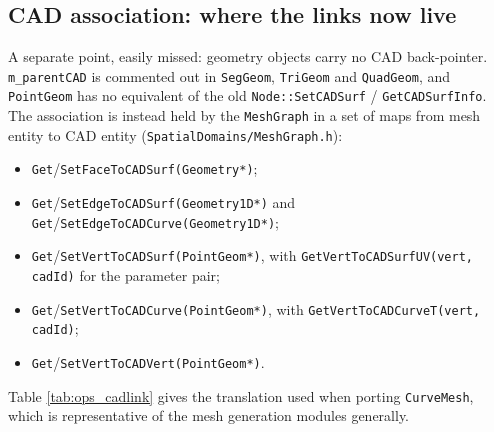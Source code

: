 \subsection{CAD association: where the links now live}
\label{sect:cad_links}
A separate point, easily missed: geometry objects carry no CAD
back-pointer. \texttt{m\_parentCAD} is commented out in
\texttt{SegGeom}, \texttt{TriGeom} and \texttt{QuadGeom}, and
\texttt{PointGeom} has no equivalent of the old
\texttt{Node::SetCADSurf} / \texttt{GetCADSurfInfo}. The association is
instead held by the \texttt{MeshGraph} in a set of maps from mesh
entity to CAD entity (\texttt{SpatialDomains/MeshGraph.h}):

\begin{itemize}
  \item \texttt{Get}/\texttt{SetFaceToCADSurf(Geometry*)};
  \item \texttt{Get}/\texttt{SetEdgeToCADSurf(Geometry1D*)} and
    \texttt{Get}/\texttt{SetEdgeToCADCurve(Geometry1D*)};
  \item \texttt{Get}/\texttt{SetVertToCADSurf(PointGeom*)}, with
    \texttt{GetVertToCADSurfUV(vert, cadId)} for the parameter pair;
  \item \texttt{Get}/\texttt{SetVertToCADCurve(PointGeom*)}, with
    \texttt{GetVertToCADCurveT(vert, cadId)};
  \item \texttt{Get}/\texttt{SetVertToCADVert(PointGeom*)}.
\end{itemize}

Table \ref{tab:ops_cadlink} gives the translation used when porting
\texttt{CurveMesh}, which is representative of the mesh generation
modules generally.

